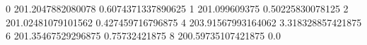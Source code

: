 0 201.2047882080078 0.6074371337890625
1 201.099609375 0.50225830078125
2 201.02481079101562 0.427459716796875
4 203.91567993164062 3.318328857421875
6 201.35467529296875 0.75732421875
8 200.59735107421875 0.0
